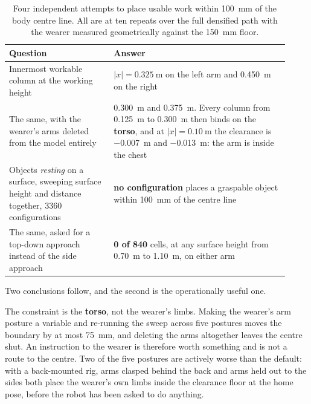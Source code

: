 \begin{table}[htbp]
  \centering
  \caption[The centre, four measurements]{Four independent attempts to place
  usable work within \SI{100}{\milli\metre} of the body centre line. All are
  at ten repeats over the full densified path with the wearer measured
  geometrically against the \SI{150}{\milli\metre} floor.}
  \label{tab:centre}
  \begin{tabular}{@{}p{0.34\linewidth}p{0.58\linewidth}@{}}
    \toprule
    Question & Answer \\
    \midrule
    Innermost workable column at the working height &
      $|x| = \SI{0.325}{\metre}$ on the left arm and \SI{0.450}{\metre} on the
      right \\
    The same, with the wearer's arms deleted from the model entirely &
      \SI{0.300}{\metre} and \SI{0.375}{\metre}. Every column from
      \SI{0.125}{\metre} to \SI{0.300}{\metre} then binds on the
      \textbf{torso}, and at $|x| = \SI{0.10}{\metre}$ the clearance is
      \SI{-0.007}{\metre} and \SI{-0.013}{\metre}: the arm is inside the chest \\
    Objects \emph{resting} on a surface, sweeping surface height and distance
      together, \num{3360} configurations &
      \textbf{no configuration} places a graspable object within
      \SI{100}{\milli\metre} of the centre line \\
    The same, asked for a top-down approach instead of the side approach &
      \textbf{0 of 840} cells, at any surface height from \SI{0.70}{\metre} to
      \SI{1.10}{\metre}, on either arm \\
    \bottomrule
  \end{tabular}
\end{table}

Two conclusions follow, and the second is the operationally useful one.

The constraint is the \textbf{torso}, not the wearer's limbs. Making the
wearer's arm posture a variable and re-running the sweep across five postures
moves the boundary by at most \SI{75}{\milli\metre}, and deleting the arms
altogether leaves the centre shut. An instruction to the wearer is therefore
worth something and is not a route to the centre. Two of the five postures are
actively worse than the default: with a back-mounted rig, arms clasped behind
the back and arms held out to the sides both place the wearer's own limbs
inside the clearance floor at the home pose, before the robot has been asked
to do anything.

